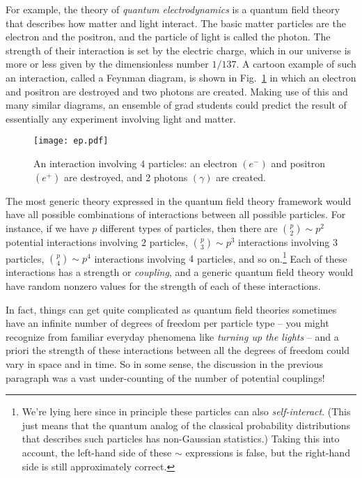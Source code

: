 \documentclass[12pt]{article}
\begin{document}
For example, the theory of \emph{quantum electrodynamics} is a quantum field theory that describes how matter and light interact. The basic matter particles are the electron and the positron, and the particle of light is called the photon. The strength of their interaction is set by the electric charge, which in our universe is more or less given by the dimensionless number $1/137$.  A cartoon example of such an interaction, called a Feynman diagram, 
is shown in Fig.~\ref{fig:feynman} in which an electron and positron are destroyed and two photons are created. Making use of this and many similar diagrams, an ensemble
 of grad students could predict the result of essentially any experiment involving light and matter.


\begin{figure}[h]
\begin{center}
\texttt{[image: ep.pdf]}
\caption{An interaction involving $4$ particles: an electron $(e^-)$ and positron $(e^+)$ are destroyed, and 2 photons $(\gamma)$ are created.}
\label{fig:feynman}
\end{center}
\end{figure}





The most generic theory expressed in the quantum field theory framework would have all possible combinations of interactions between all possible particles. For instance, if we have $p$ different types of particles, then
there are $\binom{p}{2}\sim p^2$ potential interactions involving $2$ particles, $\binom{p}{3}\sim p^3$ interactions involving $3$ particles, $\binom{p}{4}\sim p^4$ interactions involving $4$ particles, and so on.\footnote{We're lying here since in principle these particles can also \emph{self-interact}. (This just means that the quantum analog of the classical probability distributions that describes such particles has non-Gaussian statistics.) Taking this into account, the left-hand side of these $\sim$ expressions is false, but the right-hand side is still approximately correct.
}
Each of these interactions has a strength or \emph{coupling}, 
and a generic quantum field theory would have random nonzero values for the strength of each of these interactions.






In fact, things can get quite complicated as quantum field theories sometimes have an infinite number of degrees of freedom per particle type -- you might recognize from familiar everyday phenomena like \emph{turning up the lights} --  and a priori the strength of these interactions between all the degrees of freedom could vary in space and in time. So in some sense, the discussion in the previous paragraph was a vast under-counting of the number of potential couplings!
\end{document}
